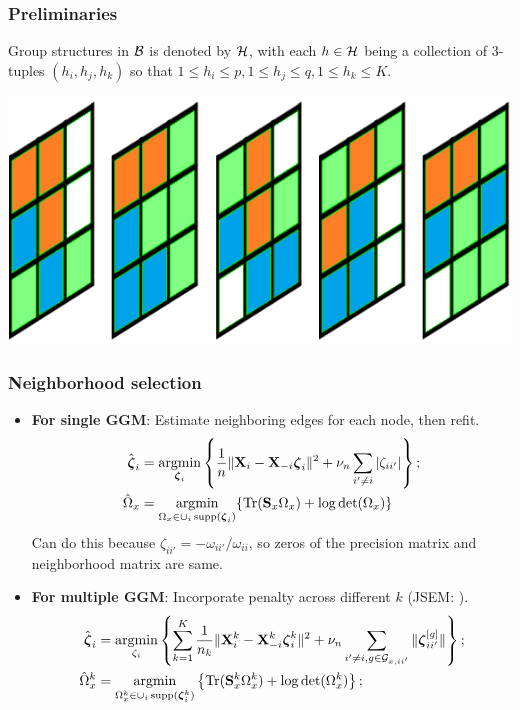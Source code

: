 \documentclass[10pt]{beamer}
\theoremstyle{definition}
\DeclareMathOperator*{\Tr}{Tr}
\DeclareMathOperator*{\argmin}{argmin}
\DeclareMathOperator*{\supp}{\text{supp}}
\begin{document}
\begin{frame}
\frametitle{Preliminaries}

Group structures in ${\cal{B}}$ is denoted by ${\cal{H}}$, with each $h \in {\cal{H}}$ being a collection of 3-tuples $(h_i,h_j,h_k)$ so that $1 \leq h_i \leq p, 1 \leq h_j \leq q, 1 \leq h_k \leq K$.

\vspace{2em}
\centering
\includegraphics[width=.6\textwidth]{layersB}
\end{frame}


\begin{frame}
\frametitle{Neighborhood selection}

\begin{itemize}
\item {\bf For single GGM}: Estimate neighboring edges for each node, then refit.
%
\begin{align*}
\hat \bfzeta_i &= \argmin_{\bfzeta_i} \left\{ \frac{1}{n} \| \bfX_i - \bfX_{-i} \bfzeta_i \|^2 + \nu_n \sum_{i' \neq i} |\zeta_{ii'}| \right\};\\
\hat \Omega_x &= \argmin_{\Omega_x \in \cup_i \supp (\bfzeta_i)}
\{ \Tr (\bfS_x \Omega_x ) + \log \det(\Omega_x) \}
\end{align*}
%
Can do this because $\zeta_{ii'} = -\omega_{ii'}/\omega_{ii}$, so zeros of the precision matrix and neighborhood matrix are same.

\item {\bf For multiple GGM}: Incorporate penalty across different $k$ (JSEM: \cite{MaMichailidis15}).
%
\begin{align*}
\hat \bfzeta_i &= \argmin_{\zeta_i} \left\{ \sum_{k=1}^K \frac{1}{n_k} \| \bfX_i^k - \bfX_{-i}^k \bfzeta_i^k \|^2 + \nu_n \sum_{i' \neq i, g \in \cG_{x,ii'}} \| \bfzeta_{ii'}^{[g]} \| \right\};\\
\hat \Omega_x^k &= \argmin_{\Omega_x^k \in \cup_i \supp (\bfzeta_i^k)}
\left\{ \Tr (\bfS_x^k \Omega_x^k ) + \log \det (\Omega_x^k ) \right\}; \end{align*}
%
\end{itemize}
\end{frame}
\end{document}
